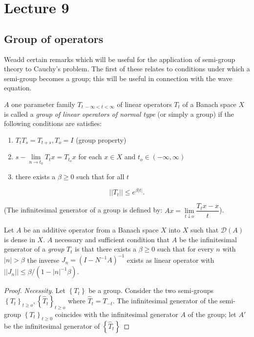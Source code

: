 \chapter{Lecture 9}\label{chap9} %
 
\section{Group of operators}\label{chap9:sec1}
 
We\pageoriginale add certain remarks which will be useful for the application of
semi-group theory to Cauchy's problem. The first of these relates to
conditions under which a semi-group becomes a group; this will be
useful in connection with the wave equation. 
 
\begin{defi*}%
 $A$ one parameter family $T_{t ~- \infty < t < \infty}$ of linear
 operators $T_t$ of a Banach space $X$ is called a \textit{group of
  linear operators of normal type} (or simply a group) if the
 following conditions are satisfies: 
 \begin{enumerate}[\rm i)]
 \item $T_t T_s= T_{t+s}, T_o =I$ (group property)
 \item $s-\lim\limits_{n\to t_0} T_t x = T_{t_o}x $ for each $x
  \in X$ and $t_o \in (- \infty, \infty)$ 
 \item there exists a $\beta \ge 0$ such that for all $t$
 \end{enumerate}
 $$
 || T_t || \le e^{\beta|t|}.
 $$
\end{defi*}  
\noindent  (The infinitesimal generator of a group is defined by: $Ax=
 \lim\limits_{t \downarrow o} \dfrac{T_t x-x}{t}$). 

\begin{theorem*}%
 Let $A$ be an additive operator from a Banach space $X$ into $X$
 such that $\mathscr{D}(A)$ is dense in $X$. $A$ necessary and
 sufficient condition that $A$ be the infinitesimal generator of a
 \textit{group} $T_t$ is that there exists a $\beta \ge 0$ such that
 for every $n$ with $|n| > \beta$ the inverse $J_n = (I-N^{-1}
 A)^{-1}$ exists as linear operator with $|| J_n || \le \beta /(1-
 |n|^{-1} \beta)$.  
\end{theorem*} 
 
\begin{proof}%
 {\em Necessity}. Let $\left\{ T_t \right\}$ be a group. Consider the
 two semi-groups $\left\{T_t\right\}_{t \ge o},
 \left\{\hat{T}_t\right\}_{t \ge o}$ where $\hat{T}_t = T_{-t}$. The
 infinitesimal generator of the semi-group $\left\{T_t\right\}_{t \ge
  0}$ coincides with the infinitesimal generator $A$ of the group;
 let $A'$ be the infinitesimal generator of
 $\left\{\hat{T}_t\right\}$ 
\end{proof}  
 
